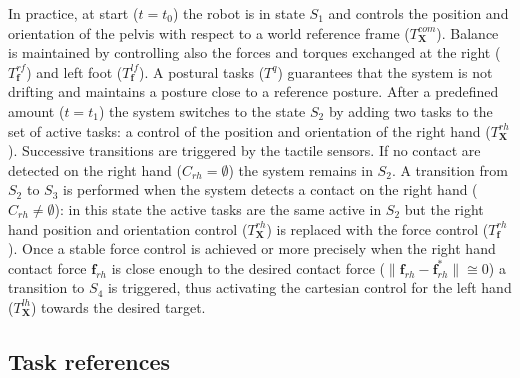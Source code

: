 \documentclass[12pt,a4paper,twoside]{article}
\begin{document}
In practice, at start ($t = t_0$) the robot is in state $S_1$ and controls the position and orientation of the pelvis with respect to a world reference frame ($T^{com}_{\bm X}$). Balance is maintained by controlling also the forces and torques exchanged at the right ($T^{rf}_{\bm f}$) and left foot ($T^{lf}_{\bm f}$). A postural tasks ($T^q$) guarantees that the system is not drifting and maintains a posture close to a reference posture. After a predefined amount ($t = t_1$) the system switches to the state $S_2$ by adding two tasks to the set of active tasks: a control of the position and orientation of the right hand ($T^{rh}_{\bm X}$). Successive transitions are triggered by the tactile sensors. If no contact are detected on the right hand ($C_{rh} = \emptyset$) the system remains in $S_2$. A transition from $S_2$ to $S_3$ is performed when the system detects a contact on the right hand ($C_{rh} \neq \emptyset$): in this state the active tasks are the same active in $S_2$ but the right hand position and orientation control ($T^{rh}_{\bm X}$) is replaced with the force control ($T^{rh}_{\bm f}$). Once a stable force control is achieved or more precisely when the right hand contact force ${\bm f}_{rh}$ is close enough to the desired contact force ($\| {\bm f}_{rh} - {\bm f}^*_{rh} \| \cong 0 $) a transition to $S_4$ is triggered, thus activating the cartesian control for the left hand ($T^{lh}_{\bm X}$) towards the desired target.

\subsection{Task references} \label{sec:taskReferences}
\end{document}
